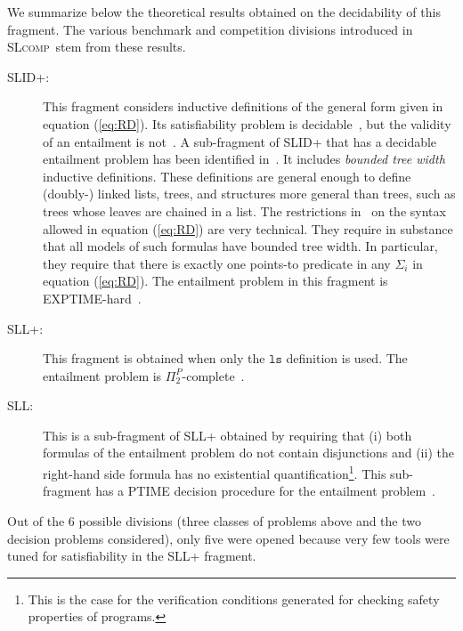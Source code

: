\documentclass[twoside,11pt]{article}
\newcommand{\ls}{\mathtt{ls}}
\newcommand{\SLRD}{\textsc{SLID}}
\newcommand{\SLL}{\textsc{SLL}}
\newcommand{\slcomp}{\textsc{SLcomp}}
\begin{document}
We summarize below the theoretical results obtained on the decidability of this fragment.
The various benchmark and competition divisions introduced in \slcomp\ stem from these results.
\begin{description}
\item[\SLRD+:]
This fragment considers inductive definitions of the general form given in equation (\ref{eq:RD}).
Its satisfiability problem is decidable~\cite{BrotherstonFGNP13},
but the validity of an entailment is not~\cite{AntonopoulosGHKO14}.
%
A sub-fragment of \SLRD+ that has a decidable entailment problem has been identified in~\cite{IosifRS13}. It includes \emph{bounded tree width} inductive definitions.
These definitions are general enough to define (doubly-) linked lists, trees,
and structures more general than trees, such as trees whose leaves are chained in
a list. 
The restrictions in~\cite{IosifRS13} on the syntax allowed in equation (\ref{eq:RD}) are very technical. They require in substance that all models of such formulas have bounded tree width. 
In particular, they require that there is exactly one points-to predicate in any $\Sigma_i$ in equation (\ref{eq:RD}).
The entailment problem in this fragment is EXPTIME-hard~\cite{AntonopoulosGHKO14}.

\item[\SLL+:]
This fragment is obtained when only the $\ls$ definition is used.
The entailment problem is $\Pi^P_2$-complete~\cite{AntonopoulosGHKO14}.

\item[\SLL:]
This is a sub-fragment of \SLL+ obtained by requiring that
(i) both formulas of the entailment problem do not contain disjunctions and 
(ii) the right-hand side formula has no existential quantification\footnote{This is the case for the verification conditions generated for checking safety properties of programs.}. 
This sub-fragment has a PTIME decision procedure for the entailment problem~\cite{CookHOPW11}.
\end{description}


Out of the 6 possible divisions (three classes of problems above and the two decision problems considered), 
only five were opened because very few tools were tuned for satisfiability in the \SLL+ fragment.
\end{document}
